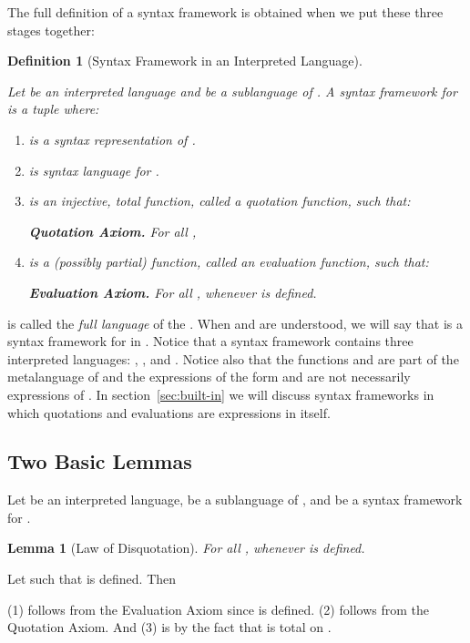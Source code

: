 \documentclass[11pt,fleqn]{article}
\newcommand{\be}{\begin{enumerate}}
\newcommand{\ee}{\end{enumerate}}
\newcommand{\bsp}{\begin{sloppypar}}
\newcommand{\esp}{\end{sloppypar}}
\newcommand{\dblsp}{\ \ }
\newtheorem{lem}[thm]{Lemma}
\newtheorem{df}[thm]{Definition}
\newenvironment{proof}{\par\noindent{\bf Proof\dblsp}}{\hfill}
\begin{document}
The full definition of a syntax framework is obtained when we put these
three stages together:

\begin{df}[Syntax Framework in an Interpreted Language]\label{df:syn-frame-lang}\em
\bsp
Let  be an interpreted language
and  be a sublanguage of .  A \emph{syntax framework}
for  is a tuple  where:\esp

\be

  \item  is a syntax representation of
    .

  \item  is syntax language for .

  \item  is an injective, total
    function, called a \emph{quotation function}, such that:

    \textbf{Quotation Axiom.} For all , 

  \item  is a (possibly partial)
    function, called an \emph{evaluation function}, such that:

    \textbf{Evaluation Axiom.} For all , 
    whenever  is defined. \hfill 

\ee 
\end{df}
\bsp \noindent  is called the \emph{full language} of the .
When  and  are understood, we will say that
 is a syntax framework for  in .  Notice that a
syntax framework contains three interpreted languages: , , and
.  Notice also that the
functions  and  are part of the metalanguage of  and the
expressions of the form  and  are not necessarily
expressions of .  In section~\ref{sec:built-in} we will discuss
syntax frameworks in which quotations and evaluations are expressions
in  itself. \esp

\subsection{Two Basic Lemmas}

\bsp Let  be an interpreted language,
 be a sublanguage of , and  be a syntax framework for . \esp

\begin{lem}[Law of Disquotation] \label{lem:disquotation}
For all , 
whenever  is defined.
\end{lem}

\begin{proof}
Let  such that  is defined.  Then
\setcounter{equation}{0}

(1) follows from the Evaluation Axiom since  is defined. (2)
follows from the Quotation Axiom.  And (3) is by the fact that  is total on .
\end{proof}
\end{document}
